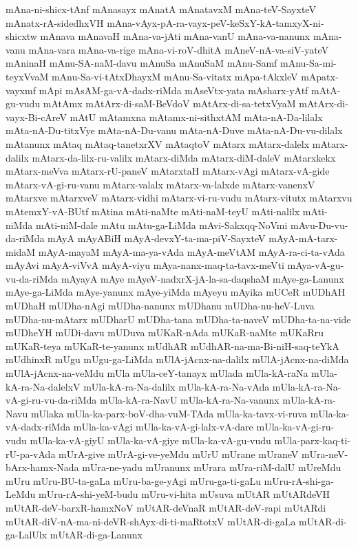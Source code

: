{mAna-ni-shicx-tAnf
mAnasayx
mAnatA
mAnatavxM
mAna-teV-SayxteV
mAnatx-rA-sidedhxVH
mAna-vAyx-pA-ra-vayx-peV-keSxY-kA-tamxyX-ni-shicxtw
mAnava
mAnavaH
mAna-va-jAti
mAna-vanU
mAna-va-nanunx
mAna-vanu
mAna-vara
mAna-va-rige
mAna-vi-roV-dhitA
mAneV-nA-va-siV-yateV
mAninaH
mAnu-SA-naM-davu
mAnuSa
mAnuSaM
mAnu-Samf
mAnu-Sa-mi-teyxVvaM
mAnu-Sa-vi-tAtxDhayxM
mAnu-Sa-vitatx
mApa-tAkxleV
mApatx-vayxmf
mApi
mAsAM-ga-vA-dadx-riMda
mAseVtx-yata
mAsharx-yAtf
mAtA-gu-vudu
mAtAmx
mAtArx-di-saM-BeVdoV
mAtArx-di-sa-tetxVyaM
mAtArx-di-vayx-Bi-cAreV
mAtU
mAtamxna
mAtamx-ni-sithxtAM
mAta-nA-Da-lilalx
mAta-nA-Du-titxVye
mAta-nA-Du-vanu
mAta-nA-Duve
mAta-nA-Du-vu-dilalx
mAtanunx
mAtaq
mAtaq-tanetxrXV
mAtaqtoV
mAtarx
mAtarx-dalelx
mAtarx-dalilx
mAtarx-da-lilx-ru-valilx
mAtarx-diMda
mAtarx-diM-daleV
mAtarxkekx
mAtarx-meVva
mAtarx-rU-paneV
mAtarxtaH
mAtarx-vAgi
mAtarx-vA-gide
mAtarx-vA-gi-ru-vanu
mAtarx-valalx
mAtarx-va-lalxde
mAtarx-vanenxV
mAtarxve
mAtarxveV
mAtarx-vidhi
mAtarx-vi-ru-vudu
mAtarx-vitutx
mAtarxvu
mAtemxY-vA-BUtf
mAtina
mAti-naMte
mAti-naM-teyU
mAti-nalilx
mAti-niMda
mAti-niM-dale
mAtu
mAtu-ga-LiMda
mAvi-Sakxqq-NoVmi
mAvu-Du-vu-da-riMda
mAyA
mAyABiH
mAyA-devxY-ta-ma-piV-SayxteV
mAyA-mA-tarx-midaM
mAyA-mayaM
mAyA-ma-ya-vAda
mAyA-meVtAM
mAyA-ra-ci-ta-vAda
mAyAvi
mAyA-viVvA
mAyA-viyu
mAya-nanx-maq-ta-tavx-meVti
mAya-vA-gu-vu-da-riMda
mAyayA
mAye
mAyeV-nadxrX-jA-la-sa-daqshaM
mAye-ga-Lanunx
mAye-ga-LiMda
mAye-yanunx
mAye-yiMda
mAyeyu
mAyika
mUCeR
mUDhAH
mUDhaH
mUDha-nAgi
mUDha-nanunx
mUDhanu
mUDha-nu-heV-Luva
mUDha-nu-mAtarx
mUDharU
mUDha-tana
mUDha-ta-naveV
mUDha-ta-na-vide
mUDheYH
mUDi-davu
mUDuva
mUKaR-nAda
mUKaR-naMte
mUKaRru
mUKaR-teya
mUKaR-te-yanunx
mUdhAR
mUdhAR-na-ma-Bi-niH-saq-teYkA
mUdhinxR
mUgu
mUgu-ga-LiMda
mUlA-jAcnx-na-dalilx
mUlA-jAcnx-na-diMda
mUlA-jAcnx-na-veMdu
mUla
mUla-ceY-tanayx
mUlada
mUla-kA-raNa
mUla-kA-ra-Na-dalelxV
mUla-kA-ra-Na-dalilx
mUla-kA-ra-Na-vAda
mUla-kA-ra-Na-vA-gi-ru-vu-da-riMda
mUla-kA-ra-NavU
mUla-kA-ra-Na-vanunx
mUla-kA-ra-Navu
mUlaka
mUla-ka-parx-boV-dha-vuM-TAda
mUla-ka-tavx-vi-ruva
mUla-ka-vA-dadx-riMda
mUla-ka-vAgi
mUla-ka-vA-gi-lalx-vA-dare
mUla-ka-vA-gi-ru-vudu
mUla-ka-vA-giyU
mUla-ka-vA-giye
mUla-ka-vA-gu-vudu
mUla-parx-kaq-ti-rU-pa-vAda
mUrA-give
mUrA-gi-ve-yeMdu
mUrU
mUrane
mUraneV
mUra-neV-bArx-hamx-Nada
mUra-ne-yadu
mUranunx
mUrara
mUra-riM-dalU
mUreMdu
mUru
mUru-BU-ta-gaLa
mUru-ba-ge-yAgi
mUru-ga-ti-gaLu
mUru-rA-shi-ga-LeMdu
mUru-rA-shi-yeM-budu
mUru-vi-hita
mUsuva
mUtAR
mUtARdeVH
mUtAR-deV-barxR-hamxNoV
mUtAR-deVnaR
mUtAR-deV-rapi
mUtARdi
mUtAR-diV-nA-ma-ni-deVR-shAyx-di-ti-maRtotxV
mUtAR-di-gaLa
mUtAR-di-ga-LalUlx
mUtAR-di-ga-Lanunx
}
